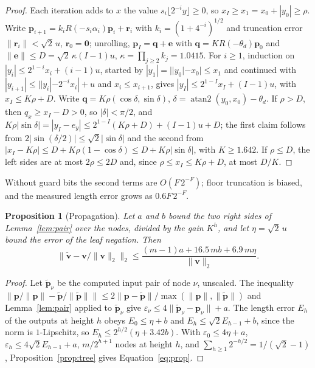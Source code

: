 \documentclass[9pt,twocolumn]{extarticle}
\newcommand{\norm}[1]{\lVert #1\rVert}
\newtheorem{proposition}{Proposition}
\begin{document}
\begin{proof}
Each iteration adds to $x$ the value $s_i\lfloor 2^{-i}y\rfloor \ge 0$, so
$x_I \ge x_1 = x_0 + |y_0| \ge \rho$. Write
$\bm p_{i+1} = k_i R(-s_i\alpha_i)\bm p_i + \bm r_i$ with
$k_i = (1 + 4^{-i})^{1/2}$ and truncation error $\norm{\bm r_i} < \sqrt2\,u$,
$\bm r_0 = \bm 0$; unrolling, $\bm p_I = \bm q + \bm e$ with
$\bm q = K R(-\theta_d)\bm p_0$ and
$\norm{\bm e} \le D = \sqrt2\,\kappa(I - 1)u$,
$\kappa = \prod_{j\ge2} k_j = 1.0415$. For $i \ge 1$, induction on
$|y_i| \le 2^{1-i}x_i + (i - 1)u$, started by $|y_1| = ||y_0| - x_0| \le x_1$
and continued with $|y_{i+1}| \le ||y_i| - 2^{-i}x_i| + u$ and
$x_i \le x_{i+1}$, gives $|y_I| \le 2^{1-I}x_I + (I - 1)u$, with
$x_I \le K\rho + D$. Write $\bm q = K\rho(\cos\delta, \sin\delta)$,
$\delta = \operatorname{atan2}(y_0, x_0) - \theta_d$. If $\rho > D$, then
$q_x \ge x_I - D > 0$, so $|\delta| < \pi/2$, and
$K\rho|\sin\delta| = |y_I - e_y| \le 2^{1-I}(K\rho + D) + (I - 1)u + D$; the
first claim follows from $2|\sin(\delta/2)| \le \sqrt2|\sin\delta|$ and the
second from $|x_I - K\rho| \le D + K\rho(1 - \cos\delta) \le D + K\rho|\sin
\delta|$, with $K \ge 1.642$. If $\rho \le D$, the left sides are at most
$2\rho \le 2D$ and, since $\rho \le x_I \le K\rho + D$, at most $D/K$.
\end{proof}

Without guard bits the second terms are $O(F\,2^{-F})$; floor truncation is
biased, and the measured length error grows as $0.6F\,2^{-F}$.

\begin{proposition}[Propagation]\label{prop:prop}
Let $a$ and $b$ bound the two right sides of Lemma~\ref{lem:pair} over the
nodes, divided by the gain $K^h$, and let $\eta = \sqrt2\,u$ bound the error of
the leaf negation. Then
\begin{equation}
\norm{\tilde{\bm v} - \bm v/\norm{\bm v}_2}_2
\le \frac{(m - 1)a + 16.5\,m b + 6.9\,m\eta}{\norm{\bm v}_2} .
\label{eq:prop}
\end{equation}
\end{proposition}

\begin{proof}
Let $\tilde{\bm p}_\nu$ be the computed input pair of node $\nu$, unscaled. The
inequality $\norm{\bm p/\norm{\bm p} - \tilde{\bm p}/\norm{\tilde{\bm p}}}
\le 2\norm{\bm p - \tilde{\bm p}}/\max(\norm{\bm p}, \norm{\tilde{\bm p}})$ and
Lemma~\ref{lem:pair} applied to $\tilde{\bm p}_\nu$ give
$\varepsilon_\nu \le 4\norm{\tilde{\bm p}_\nu - \bm p_\nu} + a$. The length
error $E_h$ of the outputs at height $h$ obeys $E_0 \le \eta + b$ and
$E_h \le \sqrt2 E_{h-1} + b$, since the norm is $1$-Lipschitz, so
$E_h \le 2^{h/2}(\eta + 3.42b)$. With $\varepsilon_0 \le 4\eta + a$,
$\varepsilon_h \le 4\sqrt2E_{h-1} + a$, $m/2^{h+1}$ nodes at height $h$, and
$\sum_{h\ge1}2^{-h/2} = 1/(\sqrt2 - 1)$, Proposition~\ref{prop:tree} gives
Equation~\eqref{eq:prop}.
\end{proof}
\end{document}
